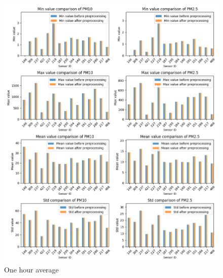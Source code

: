 \documentclass[12pt,a4paper,twoside]{scrartcl}
\numberwithin{equation}{section}
\newcounter{mypagecount}%
\newenvironment{interlude}{%
  \clearpage
  \setcounter{mypagecount}{\value{page}}%
  \thispagestyle{empty}%
  \pagestyle{empty}%
}{%
  \clearpage
  \setcounter{page}{\value{mypagecount}}%
}
\begin{document}
\begin{interlude}
\begin{appendices}
\begin{center}
      \begin{figure}[H]
        \centerline{\includegraphics[width=1.1\textwidth,height=1.3\textwidth]{figures/data_files_changes/1H_sensor_metrics}}
        \caption[Metrics change during preprocessing (one hour average)]{One hour average}
      \end{figure}
      
    \end{center}
    \clearpage

\end{appendices}
\end{interlude}
\end{document}
